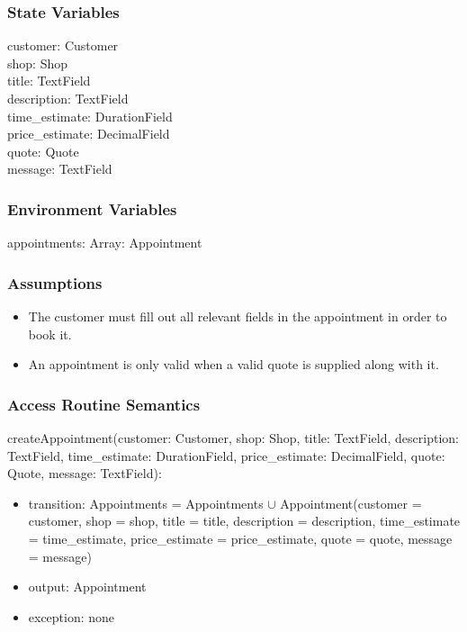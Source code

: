\documentclass[12pt, titlepage]{article}
\begin{document}
\subsubsection{State Variables}

customer: Customer \\
shop: Shop \\
title: TextField \\
description: TextField \\
time\_estimate: DurationField \\
price\_estimate: DecimalField \\
quote: Quote \\
message: TextField \\

\subsubsection{Environment Variables}

appointments: Array: Appointment \\

\subsubsection{Assumptions}

\begin{itemize}
    \item The customer must fill out all relevant fields in the appointment in order to book it.
    \item An appointment is only valid when a valid quote is supplied along with it.
\end{itemize}

\subsubsection{Access Routine Semantics}

createAppointment(customer: Customer, shop: Shop, title: TextField, description: TextField, time\_estimate: DurationField, price\_estimate: DecimalField, quote: Quote, message: TextField):
\begin{itemize}
    \item transition: Appointments = Appointments $\cup$ Appointment(customer = customer, shop = shop, title = title, description = description, time\_estimate = time\_estimate, price\_estimate = price\_estimate, quote = quote, message = message)
    \item output: Appointment
    \item exception: none
\end{itemize}
\end{document}
